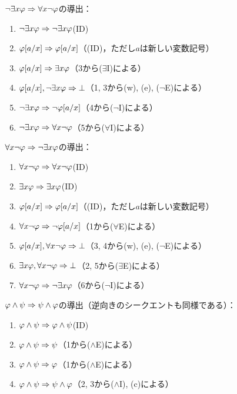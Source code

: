 \(\lnot \exists x \varphi \Rightarrow \forall x \lnot \varphi\)の導出：
\begin{enumerate}
	\item \(\lnot \exists x \varphi \Rightarrow \lnot \exists x \varphi\)\quad (ID)
	\item \(\subst{\varphi}{a/x} \sequent \subst{\varphi}{a/x}\)\quad （(ID)，ただし\(a\)は新しい変数記号）
	\item \(\subst{\varphi}{a/x} \sequent \exists x \varphi\)\quad （3から(\(\exists\)I)による）
	\item \(\subst{\varphi}{a/x}, \lnot \exists x \varphi \sequent \bot\)\quad （1, 3から(w), (e), (\(\lnot\)E)による）
	\item \(\lnot \exists x \varphi \sequent \lnot \subst{\varphi}{a/x}\)\quad （4から(\(\lnot\)I)による）
	\item \(\lnot \exists x \varphi \Rightarrow \forall x \lnot \varphi\)\quad （5から(\(\forall\)I)による）
\end{enumerate}

\(\forall x \lnot \varphi \Rightarrow \lnot \exists x \varphi\)の導出：
\begin{enumerate}
	\item \(\forall x \lnot \varphi \Rightarrow \forall x \lnot \varphi\)\quad (ID)
	\item \(\exists x \varphi \Rightarrow \exists x \varphi\)\quad (ID)
	\item \(\subst{\varphi}{a/x} \sequent \subst{\varphi}{a/x}\)\quad （(ID)，ただし\(a\)は新しい変数記号）
	\item \(\forall x \lnot \varphi \sequent \lnot \subst{\varphi}{a/x}\)\quad （1から(\(\forall\)E)による）
	\item \(\subst{\varphi}{a/x}, \forall x \lnot \varphi \sequent \bot\)\quad （3, 4から(w), (e), (\(\lnot\)E)による）
	\item \(\exists x \varphi, \forall x \lnot \varphi \Rightarrow \bot\)\quad （2, 5から(\(\exists\)E)による）
	\item \(\forall x \lnot \varphi \Rightarrow \lnot \exists x \varphi\)\quad （6から(\(\lnot\)I)による）
\end{enumerate}

\(\varphi \land \psi \Rightarrow \psi \land \varphi\)の導出（逆向きのシークエントも同様である）：
\begin{enumerate}
	\item \(\varphi \land \psi \Rightarrow \varphi \land \psi\)\quad (ID)
	\item \(\varphi \land \psi \Rightarrow \psi\)\quad （1から(\(\land\)E)による）
	\item \(\varphi \land \psi \Rightarrow \varphi\)\quad （1から(\(\land\)E)による）
	\item \(\varphi \land \psi \Rightarrow \psi \land \varphi\)\quad （2, 3から(\(\land\)I), (c)による）
\end{enumerate}

